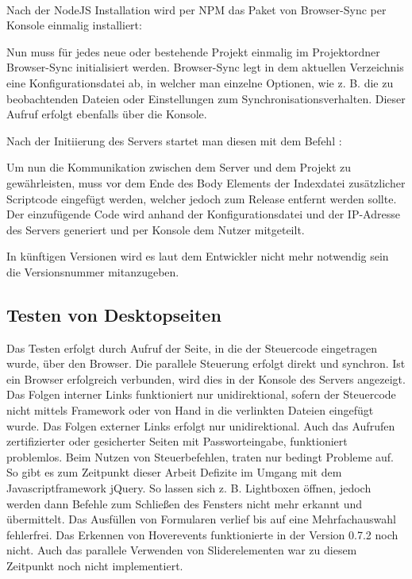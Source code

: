 	\\Nach der \gls{NodeJS} Installation wird per \Gls{NPM} das Paket von Browser-Sync per Konsole einmalig installiert:
	
	Nun muss für jedes neue oder bestehende Projekt einmalig im Projektordner Browser-Sync initialisiert werden. Browser-Sync legt in dem aktuellen Verzeichnis eine Konfigurationsdatei ab, in welcher man einzelne Optionen, wie z. B. die zu beobachtenden Dateien oder Einstellungen zum Synchronisationsverhalten. Dieser Aufruf erfolgt ebenfalls über die Konsole.
	
	Nach der Initiierung des Servers startet man diesen mit dem Befehl :
	
	Um nun die Kommunikation zwischen dem Server und dem Projekt zu gewährleisten, muss vor dem Ende des Body Elements der Indexdatei zusätzlicher Scriptcode eingefügt werden, welcher jedoch zum Release entfernt werden sollte. Der einzufügende Code  wird anhand der Konfigurationsdatei und der IP-Adresse des Servers generiert und per Konsole dem Nutzer mitgeteilt.
	
	In künftigen Versionen wird es laut dem Entwickler nicht mehr notwendig sein die Versionsnummer mitanzugeben.
	
	\subsection{Testen von Desktopseiten}
	Das Testen erfolgt durch Aufruf der Seite, in die der Steuercode eingetragen wurde, über den Browser. Die parallele Steuerung erfolgt direkt und synchron. Ist ein Browser erfolgreich verbunden, wird dies in der Konsole des Servers angezeigt.
	Das Folgen interner Links funktioniert nur unidirektional, sofern der Steuercode nicht mittels \Gls{Framework} oder von Hand in die verlinkten Dateien eingefügt wurde. Das Folgen externer Links erfolgt nur unidirektional. Auch das Aufrufen zertifizierter oder \Gls{gesichert}er Seiten mit Passworteingabe, funktioniert problemlos. Beim Nutzen von Steuerbefehlen, traten nur bedingt Probleme auf. So gibt es zum Zeitpunkt dieser Arbeit Defizite im Umgang mit dem \Gls{Javascript}framework jQuery. So lassen sich z. B. Lightboxen öffnen, jedoch werden dann Befehle zum \mbox{Schließen} des Fensters nicht mehr erkannt und übermittelt. Das Ausfüllen von Formularen verlief bis auf eine Mehrfachauswahl fehlerfrei. Das Erkennen von Hoverevents funktionierte in der Version 0.7.2 noch nicht. Auch das parallele Verwenden von Sliderelementen war zu diesem Zeitpunkt noch nicht implementiert.
	
